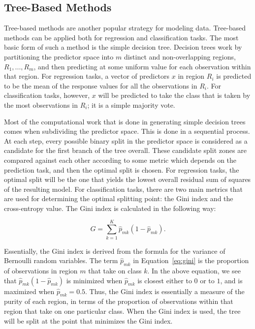 \documentclass[12pt]{article}
\begin{document}
\subsection{Tree-Based Methods}
\label{sec:tbm}

Tree-based methods are another popular strategy for modeling data.  Tree-based methods can be 
applied both for regression and classification tasks.  The most basic form of such a method is 
the simple decision tree.  Decision trees work by partitioning the predictor space into $m$ 
distinct and non-overlapping regions, $R_1, ... , R_m$, and then predicting at some uniform 
value for each observation within that region.  For regression tasks, a vector of predictors 
$x$ in region $R_i$ is predicted to be the mean of the response values for all the observations 
in $R_i$.  For classification tasks, however, $x$ will be predicted to take the class that is 
taken by the most observations in $R_i$; it is a simple majority vote.  

Most of the computational work that is done in generating simple decision trees comes when 
subdividing the predictor space.  This is done in a sequential process.  At each step, every 
possible binary split in the predictor space is considered as a candidate for the first branch 
of the tree overall.  These candidate split zones are compared against each other according to 
some metric which depends on the prediction task, and then the optimal split is chosen.  For 
regression tasks, the optimal split will be the one that yields the lowest overall residual 
sum of squares of the resulting model.  For classification tasks, there are two main metrics 
that are used for determining the optimal splitting point: the Gini index and the cross-entropy 
value.  The Gini index is calculated in the following way:

\begin{equation}
  \label{eq:gini}
   G = \sum_{k = 1} ^ {K} \hat{p}_{mk} (1 - \hat{p}_{mk}).
\end{equation} 

Essentially, the Gini index is derived from the formula for the variance of Bernoulli random 
variables.  The term $\hat{p}_{mk}$ in Equation~\eqref{eq:gini} is the proportion of 
observations in region $m$ that take on class $k$.  In the above equation, we see that 
$\hat{p}_{mk} (1 - \hat{p}_{mk})$ is minimized when $\hat{p}_{mk}$ is closest either to $0$ 
or to $1$, and is maximized when $\hat{p}_{mk} = 0.5$.  Thus, the Gini index is essentially 
a measure of the purity of each region, in terms of the proportion of observations within that 
region that take on one particular class.  When the Gini index is used, the tree will be split 
at the point that minimizes the Gini index.  
\end{document}
